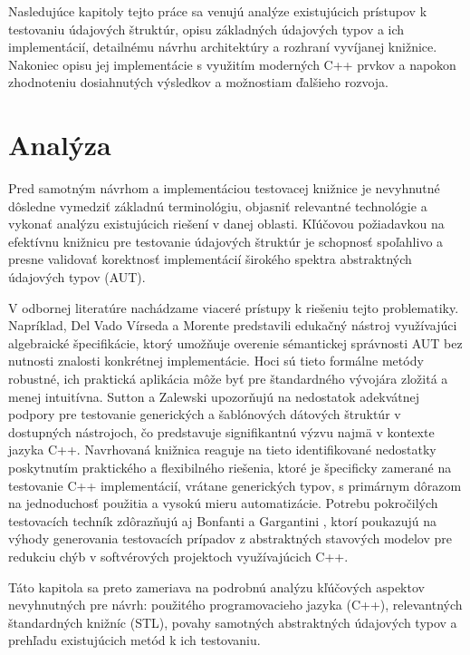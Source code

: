 \documentclass[11pt]{article}
\begin{document}
Nasledujúce kapitoly tejto práce sa venujú analýze existujúcich prístupov k testovaniu údajových štruktúr, opisu základných údajových typov a ich implementácií, detailnému návrhu architektúry a rozhraní vyvíjanej knižnice. Nakoniec opisu jej implementácie s využitím moderných C++ prvkov a napokon zhodnoteniu dosiahnutých výsledkov a možnostiam ďalšieho rozvoja.

\newpage
\section{Analýza} \label{sec:analyza}

Pred samotným návrhom a implementáciou testovacej knižnice je nevyhnutné dôsledne vymedziť základnú terminológiu, objasniť relevantné technológie a vykonať analýzu existujúcich riešení v danej oblasti. Kľúčovou požiadavkou na efektívnu knižnicu pre testovanie údajových štruktúr je schopnosť spoľahlivo a presne validovať korektnosť implementácií širokého spektra abstraktných údajových typov (AUT).

V odbornej literatúre nachádzame viaceré prístupy k riešeniu tejto problematiky. Napríklad, Del Vado Vírseda a Morente \cite{VIIRSEDA20121743} predstavili edukačný nástroj využívajúci algebraické špecifikácie, ktorý umožňuje overenie sémantickej správnosti AUT bez nutnosti znalosti konkrétnej implementácie. Hoci sú tieto formálne metódy robustné, ich praktická aplikácia môže byť pre štandardného vývojára zložitá a menej intuitívna. Sutton a Zalewski \cite{6405251} upozorňujú na nedostatok adekvátnej podpory pre testovanie generických a šablónových dátových štruktúr v dostupných nástrojoch, čo predstavuje signifikantnú výzvu najmä v kontexte jazyka C++. Navrhovaná knižnica reaguje na tieto identifikované nedostatky poskytnutím praktického a flexibilného riešenia, ktoré je špecificky zamerané na testovanie C++ implementácií, vrátane generických typov, s primárnym dôrazom na jednoduchosť použitia a vysokú mieru automatizácie. Potrebu pokročilých testovacích techník zdôrazňujú aj Bonfanti a Gargantini \cite{8411752}, ktorí poukazujú na výhody generovania testovacích prípadov z abstraktných stavových modelov pre redukciu chýb v softvérových projektoch využívajúcich C++.

Táto kapitola sa preto zameriava na podrobnú analýzu kľúčových aspektov nevyhnutných pre návrh: použitého programovacieho jazyka (C++), relevantných štandardných knižníc (STL), povahy samotných abstraktných údajových typov a prehľadu existujúcich metód k ich testovaniu.
\end{document}
